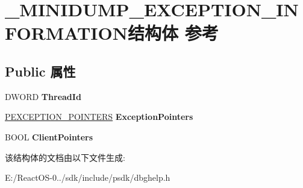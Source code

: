 \hypertarget{struct___m_i_n_i_d_u_m_p___e_x_c_e_p_t_i_o_n___i_n_f_o_r_m_a_t_i_o_n}{}\section{\+\_\+\+M\+I\+N\+I\+D\+U\+M\+P\+\_\+\+E\+X\+C\+E\+P\+T\+I\+O\+N\+\_\+\+I\+N\+F\+O\+R\+M\+A\+T\+I\+O\+N结构体 参考}
\label{struct___m_i_n_i_d_u_m_p___e_x_c_e_p_t_i_o_n___i_n_f_o_r_m_a_t_i_o_n}
\subsection*{Public 属性}
\begin{DoxyCompactItemize}
\item 
\mbox{\label{struct___m_i_n_i_d_u_m_p___e_x_c_e_p_t_i_o_n___i_n_f_o_r_m_a_t_i_o_n_a34d32bfc97a2d978219fe0fbf9b4f6a8}} 
D\+W\+O\+RD {\bfseries Thread\+Id}
\item 
\mbox{\label{struct___m_i_n_i_d_u_m_p___e_x_c_e_p_t_i_o_n___i_n_f_o_r_m_a_t_i_o_n_a54f7ba63816a6cccdb8d1cdb76ecbaa9}} 
\hyperlink{struct___e_x_c_e_p_t_i_o_n___p_o_i_n_t_e_r_s}{P\+E\+X\+C\+E\+P\+T\+I\+O\+N\+\_\+\+P\+O\+I\+N\+T\+E\+RS} {\bfseries Exception\+Pointers}
\item 
\mbox{\label{struct___m_i_n_i_d_u_m_p___e_x_c_e_p_t_i_o_n___i_n_f_o_r_m_a_t_i_o_n_a0d5894316ac77948817ef556feab00bc}} 
B\+O\+OL {\bfseries Client\+Pointers}
\end{DoxyCompactItemize}


该结构体的文档由以下文件生成\+:\begin{DoxyCompactItemize}
\item 
E\+:/\+React\+O\+S-\/0../sdk/include/psdk/dbghelp.\+h\end{DoxyCompactItemize}
